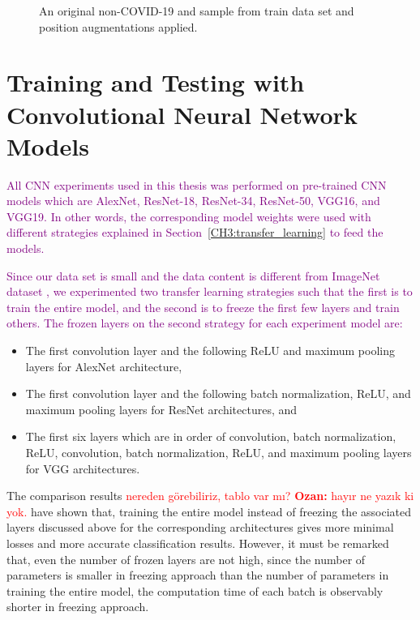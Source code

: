 \begin{figure}[h]
	\caption{An original non-COVID-19 and sample from train data set and position augmentations applied.}
	\label{augmented_sample}
\end{figure}

\section{Training and Testing with Convolutional Neural Network Models}\label{sec:CH5_cnn_experiments}

\textcolor{purple}{All CNN experiments used in this thesis was performed on pre-trained CNN models which are AlexNet, ResNet-18, ResNet-34, ResNet-50, VGG16, and VGG19. In other words, the corresponding model weights were used with different strategies explained in Section~\ref{CH3:transfer_learning} to feed the models.}

\textcolor{purple}{Since our data set is small and the data content is different from ImageNet dataset \cite{imagenet}, we experimented two transfer learning strategies such that the first is to train the entire model, and the second is to freeze the first few layers and train others. The frozen layers on the second strategy for each experiment model are:}

\begin{itemize}
	\item The first convolution layer and the following ReLU and maximum pooling layers for AlexNet architecture,
	\item The first convolution layer and the following batch normalization, ReLU, and maximum pooling layers for ResNet architectures, and
	\item The first six layers which are in order of convolution, batch normalization, ReLU, convolution, batch normalization, ReLU, and maximum pooling layers for VGG architectures.
\end{itemize}

The comparison results \textcolor{red}{nereden görebiliriz, tablo var mı? \textbf{Ozan:} hayır ne yazık ki yok.} have shown that, training the entire model instead of freezing the associated layers discussed above for the corresponding architectures gives more minimal losses and more accurate classification results. However, it must be remarked that, even the number of frozen layers are not high, since the number of parameters is smaller in freezing approach than the number of parameters in training the entire model, the computation time of each batch is observably shorter in freezing approach.

